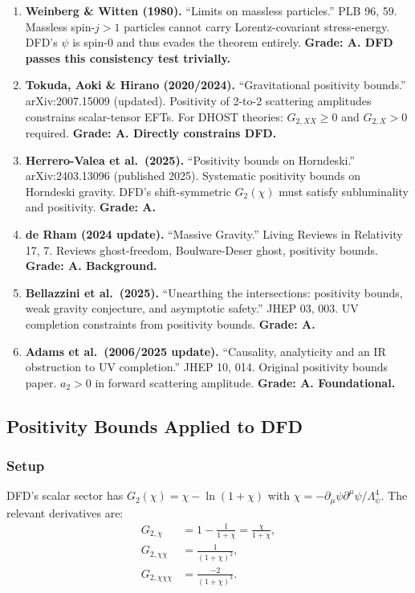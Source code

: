 \documentclass[11pt,a4paper]{article}
\begin{document}
\begin{enumerate}
\item \textbf{Weinberg \& Witten (1980).} ``Limits on massless particles.'' PLB 96, 59. Massless spin-$j > 1$ particles cannot carry Lorentz-covariant stress-energy. DFD's $\psi$ is spin-0 and thus evades the theorem entirely. \textbf{Grade: A. DFD passes this consistency test trivially.}

\item \textbf{Tokuda, Aoki \& Hirano (2020/2024).} ``Gravitational positivity bounds.'' arXiv:2007.15009 (updated). Positivity of 2-to-2 scattering amplitudes constrains scalar-tensor EFTs. For DHOST theories: $G_{2,XX} \geq 0$ and $G_{2,X} > 0$ required. \textbf{Grade: A. Directly constrains DFD.}

\item \textbf{Herrero-Valea et al.\ (2025).} ``Positivity bounds on Horndeski.'' arXiv:2403.13096 (published 2025). Systematic positivity bounds on Horndeski gravity. DFD's shift-symmetric $G_2(\chi)$ must satisfy subluminality and positivity. \textbf{Grade: A.}

\item \textbf{de Rham (2024 update).} ``Massive Gravity.'' Living Reviews in Relativity 17, 7. Reviews ghost-freedom, Boulware-Deser ghost, positivity bounds. \textbf{Grade: A. Background.}

\item \textbf{Bellazzini et al.\ (2025).} ``Unearthing the intersections: positivity bounds, weak gravity conjecture, and asymptotic safety.'' JHEP 03, 003. UV completion constraints from positivity bounds. \textbf{Grade: A.}

\item \textbf{Adams et al.\ (2006/2025 update).} ``Causality, analyticity and an IR obstruction to UV completion.'' JHEP 10, 014. Original positivity bounds paper. $a_2 > 0$ in forward scattering amplitude. \textbf{Grade: A. Foundational.}
\end{enumerate}

\subsection{Positivity Bounds Applied to DFD}

\subsubsection{Setup}

DFD's scalar sector has $G_2(\chi) = \chi - \ln(1+\chi)$ with $\chi = -\partial_\mu\psi\partial^\mu\psi/\Lambda_\psi^4$. The relevant derivatives are:
\begin{align}
G_{2,\chi} &= 1 - \frac{1}{1+\chi} = \frac{\chi}{1+\chi}, \\
G_{2,\chi\chi} &= \frac{1}{(1+\chi)^2}, \\
G_{2,\chi\chi\chi} &= \frac{-2}{(1+\chi)^3}.
\end{align}
\end{document}
